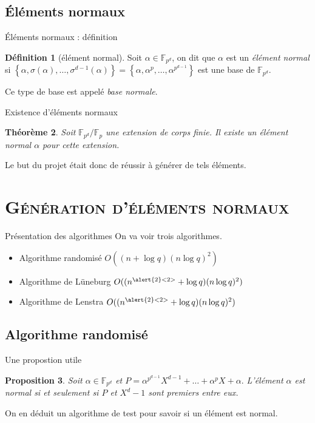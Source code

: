 \documentclass[xcolor=x11names,compress]{beamer}
\theoremstyle{break}
\newtheorem{thm}{Théorème}[section]
\newtheorem{prop}[thm]{Proposition}
\theoremstyle{sc}
\theoremstyle{definition}
\newtheorem{defi}[thm]{Définition}
\theoremstyle{remark}
\begin{document}
\subsection{Éléments normaux}
\begin{frame}{Éléments normaux : définition}
  \begin{defi}[élément normal]
    Soit $\alpha\in\mathbb{F}_{p^d}$, on dit que $\alpha$ est un \emph{élément
    normal} si $\left\{ \alpha, \sigma(\alpha), \dots, \sigma^{d-1}(\alpha)
  \right\} = \left\{ \alpha, \alpha^p, \dots, \alpha^{p^{d-1}} \right\}$ est une
  base de $\mathbb{F}_{p^d}$.
  \end{defi}
  Ce type de base est appelé \emph{base normale}.
\end{frame}

\begin{frame}{Existence d'éléments normaux}
  \begin{thm}
    Soit $\mathbb{F}_{p^d}/\mathbb{F}_p$ une extension de corps finie. Il existe
    un élément normal $\alpha$ pour cette extension.
  \end{thm}
  Le but du projet était donc de réussir à générer de tels éléments.
\end{frame}

\section{\scshape Génération d'éléments normaux}
\begin{frame}{Présentation des algorithmes}
  On va voir trois algorithmes.

  \begin{itemize}
    \item Algorithme randomisé $O((n+\log q)(n\log q)^2)$
    \item Algorithme de Lüneburg $O((n^{\alert{2}<2>}+\log q)(n\log q)^2)$
    \item Algorithme de Lenstra $O((n^{\alert{2}<2>}+\log q)(n\log q)^2)$
  \end{itemize}

\end{frame}

\subsection{Algorithme randomisé}
\begin{frame}{Une propostion utile}
  \begin{prop}
    Soit $\alpha\in\mathbb{F}_{p^d}$ et
    $P=\alpha^{p^{d-1}}X^{d-1}+\dots+\alpha^pX+\alpha.$
    L'élément $\alpha$ est normal si et seulement si $P$ et $X^d-1$ sont
    premiers entre eux.
  \end{prop}
  On en déduit un algorithme de test pour savoir si un élément est normal.
\end{frame}
\end{document}
